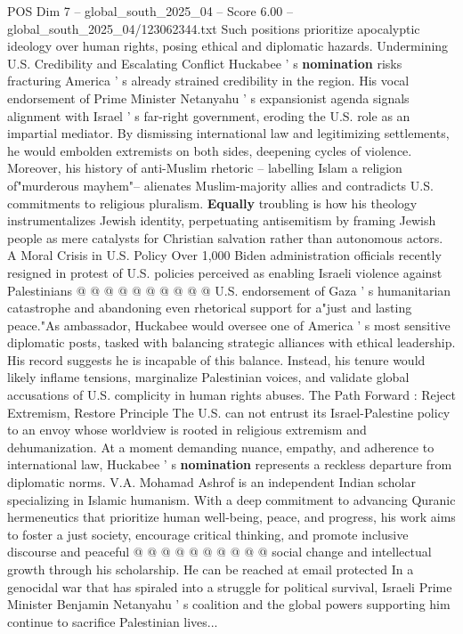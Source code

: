 \begin{textsample}{POS Dim 7 – global\_south\_2025\_04 – Score 6.00 – global\_south\_2025\_04/123062344.txt}
Such positions prioritize apocalyptic ideology over human rights, posing ethical and diplomatic hazards.
Undermining U.S.
Credibility and Escalating Conflict Huckabee ' s \textbf{nomination} risks fracturing America ' s already strained credibility in the region.
His vocal endorsement of Prime Minister Netanyahu ' s expansionist agenda signals alignment with Israel ' s far-right government, eroding the U.S. role as an impartial mediator.
By dismissing international law and legitimizing settlements, he would embolden extremists on both sides, deepening cycles of violence.
Moreover, his history of anti-Muslim rhetoric -- labelling Islam a religion of"murderous mayhem"-- alienates Muslim-majority allies and contradicts U.S. commitments to religious pluralism. \textbf{Equally} troubling is how his theology instrumentalizes Jewish identity, perpetuating antisemitism by framing Jewish people as mere catalysts for Christian salvation rather than autonomous actors.
A Moral Crisis in U.S.
Policy Over 1,000 Biden administration officials recently resigned in protest of U.S. policies perceived as enabling Israeli violence against Palestinians @ @ @ @ @ @ @ @ @ @ U.S. endorsement of Gaza ' s humanitarian catastrophe and abandoning even rhetorical support for a"just and lasting peace."As ambassador, Huckabee would oversee one of America ' s most sensitive diplomatic posts, tasked with balancing strategic alliances with ethical leadership.
His record suggests he is incapable of this balance.
Instead, his tenure would likely inflame tensions, marginalize Palestinian voices, and validate global accusations of U.S. complicity in human rights abuses.
The Path Forward : Reject Extremism, Restore Principle The U.S. can not entrust its Israel-Palestine policy to an envoy whose worldview is rooted in religious extremism and dehumanization.
At a moment demanding nuance, empathy, and adherence to international law, Huckabee ' s \textbf{nomination} represents a reckless departure from diplomatic norms.
V.A.
Mohamad Ashrof is an independent Indian scholar specializing in Islamic humanism.
With a deep commitment to advancing Quranic hermeneutics that prioritize human well-being, peace, and progress, his work aims to foster a just society, encourage critical thinking, and promote inclusive discourse and peaceful @ @ @ @ @ @ @ @ @ @ social change and intellectual growth through his scholarship.
He can be reached at email protected In a genocidal war that has spiraled into a struggle for political survival, Israeli Prime Minister Benjamin Netanyahu ' s coalition and the global powers supporting him continue to sacrifice Palestinian lives...

\end{textsample}
